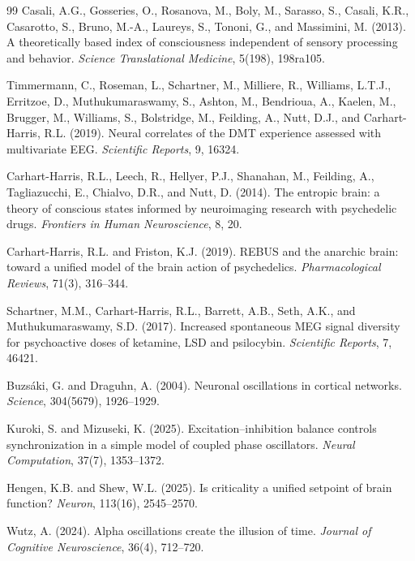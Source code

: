 \documentclass[12pt]{article}
\begin{document}
\begin{thebibliography}{99}
Casali, A.G., Gosseries, O., Rosanova, M., Boly, M., Sarasso, S., Casali, K.R.,
Casarotto, S., Bruno, M.-A., Laureys, S., Tononi, G., and Massimini, M. (2013).
A theoretically based index of consciousness independent of sensory processing and
behavior. \textit{Science Translational Medicine}, 5(198), 198ra105.

Timmermann, C., Roseman, L., Schartner, M., Milliere, R., Williams, L.T.J.,
Erritzoe, D., Muthukumaraswamy, S., Ashton, M., Bendrioua, A., Kaelen, M.,
Brugger, M., Williams, S., Bolstridge, M., Feilding, A., Nutt, D.J., and
Carhart-Harris, R.L. (2019). Neural correlates of the DMT experience assessed with
multivariate EEG. \textit{Scientific Reports}, 9, 16324.

Carhart-Harris, R.L., Leech, R., Hellyer, P.J., Shanahan, M., Feilding, A.,
Tagliazucchi, E., Chialvo, D.R., and Nutt, D. (2014). The entropic brain: a theory
of conscious states informed by neuroimaging research with psychedelic drugs.
\textit{Frontiers in Human Neuroscience}, 8, 20.

Carhart-Harris, R.L. and Friston, K.J. (2019). REBUS and the anarchic brain: toward a
unified model of the brain action of psychedelics. \textit{Pharmacological Reviews},
71(3), 316--344.

Schartner, M.M., Carhart-Harris, R.L., Barrett, A.B., Seth, A.K., and
Muthukumaraswamy, S.D. (2017). Increased spontaneous MEG signal diversity for
psychoactive doses of ketamine, LSD and psilocybin. \textit{Scientific Reports},
7, 46421.

Buzs\'{a}ki, G. and Draguhn, A. (2004). Neuronal oscillations in cortical networks.
\textit{Science}, 304(5679), 1926--1929.

Kuroki, S. and Mizuseki, K. (2025). Excitation--inhibition balance controls
synchronization in a simple model of coupled phase oscillators.
\textit{Neural Computation}, 37(7), 1353--1372.

Hengen, K.B. and Shew, W.L. (2025). Is criticality a unified setpoint of brain
function? \textit{Neuron}, 113(16), 2545--2570.

Wutz, A. (2024). Alpha oscillations create the illusion of time.
\textit{Journal of Cognitive Neuroscience}, 36(4), 712--720.

\end{thebibliography}
\end{document}
